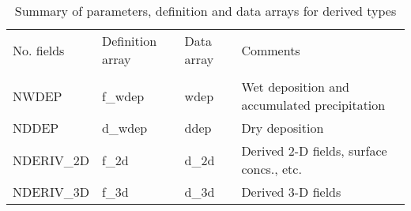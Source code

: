    \begin{table}[h]
   \caption{Summary of parameters, definition and data arrays for derived types}
   \label{TABDRV}
   \begin{tabular}{|lllp{6cm}|}\hline
     No. fields    &  Definition array & Data array  & Comments  \\
                   &               &                 &           \\
     NWDEP         &    f\_wdep    &    wdep   & Wet deposition and accumulated precipitation  \\
     NDDEP         &    d\_wdep    &    ddep   & Dry deposition   \\
     NDERIV\_2D     &    f\_2d      &    d\_2d   & Derived 2-D fields, surface concs., etc.  \\
     NDERIV\_3D     &    f\_3d      &    d\_3d   & Derived 3-D fields  \\ \hline
   \end{tabular}
   \end{table}
